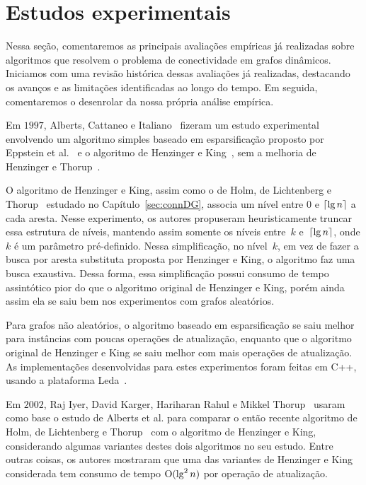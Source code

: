 \chapter{Estudos experimentais}
\label{sec:conclusao}

Nessa seção, comentaremos as principais avaliações empíricas já realizadas sobre algoritmos que resolvem o problema de conectividade em grafos dinâmicos.
Iniciamos com uma revisão histórica dessas avaliações já realizadas, destacando os avanços e as limitações identificadas ao longo do tempo.
Em seguida, comentaremos o desenrolar da nossa própria análise empírica.

Em $1997$, Alberts, Cattaneo e Italiano~\cite{EmpiricalStudy1997} fizeram um estudo experimental envolvendo um algoritmo simples baseado em esparsificação proposto por Eppstein et al.~\cite{Eppstein1992SparsificationaTF} e o algoritmo de Henzinger e King~\cite{HenzingerKing}, sem a melhoria de Henzinger e Thorup~\cite{HenzingerThorup}.

O algoritmo de Henzinger e King, assim como o de Holm, de Lichtenberg e Thorup~\cite{poly_log} estudado no Capítulo~\ref{sec:connDG}, associa um nível entre $0$ e $\lceil{\lg n}\rceil$ a cada aresta.
Nesse experimento, os autores propuseram heuristicamente truncar essa estrutura de níveis, mantendo assim somente os níveis entre~$k$ e~$\lceil{\lg n}\rceil$, onde $k$ é um parâmetro pré-definido.
Nessa simplificação, no nível~$k$, em vez de fazer a busca por aresta substituta proposta por Henzinger e King, o algoritmo faz uma busca exaustiva. Dessa forma, essa simplificação possui consumo de tempo assintótico pior do que o algoritmo original de Henzinger e King, porém ainda assim ela se saiu bem nos experimentos com grafos aleatórios.

Para grafos não aleatórios, o algoritmo baseado em esparsificação se saiu melhor para instâncias com poucas operações de atualização, enquanto que o algoritmo original de Henzinger e King se saiu melhor com mais operações de atualização.
As implementações desenvolvidas para estes experimentos foram feitas em C++, usando a plataforma Leda~\cite{LEDA}.

Em $2002$, Raj Iyer, David Karger, Hariharan Rahul e Mikkel Thorup~\cite{EmpiricalStudy2002} usaram como base o estudo de Alberts et al. para comparar o então recente algoritmo de Holm, de Lichtenberg e Thorup~\cite{poly_log} com o algoritmo de Henzinger e King, considerando algumas variantes destes dois algoritmos no seu estudo.
Entre outras coisas, os autores mostraram que uma das variantes de Henzinger e King considerada tem consumo de tempo $\mathrm{O}(\lg^2 n)$ por operação de atualização.

